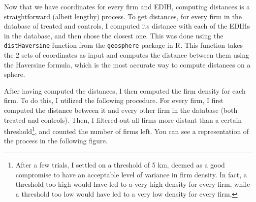 \documentclass[12pt]{report}
\begin{document}
\par Now that we have coordinates for every firm and EDIH, computing distances is a straightforward (albeit lengthy) process. To get distances, for every firm in the database of treated and controls, I computed its distance with each of the EDIHs in the database, and then chose the closest one. This was done using the \texttt{distHaversine} function from the \texttt{geosphere} package in R. This function takes the 2 sets of coordinates as input and computes the distance between them using the Haversine formula, which is the most accurate way to compute distances on a sphere. 

\par After having computed the distances, I then computed the firm density for each firm. To do this, I utilized the following procedure. For every firm, I first computed the distance between it and every other firm in the database (both treated and controls). Then, I filtered out all firms more distant than a certain threshold\footnote{After a few trials, I settled on a threshold of 5 km, deemed as a good compromise to have an acceptable level of variance in firm density. In fact, a threshold too high would have led to a very high density for every firm, while a threshold too low would have led to a very low density for every firm.}, and counted the number of firms left. You can see a representation of the process in the following figure.

\begin{figure}[ht]
    \centering
    \caption{}
    \label{fig:firm_density_glyph}
\end{figure}
\end{document}
